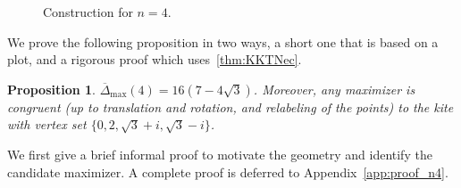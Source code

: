 \documentclass{article}
\newtheorem{proposition}[thr]{Proposition}
\theoremstyle{definition}
\begin{document}
\begin{figure}
\centering
{}
\caption{Construction for \(n=4\).}\label{fig:n=4}
\end{figure}

We prove the following proposition in two ways, a short one that is based on a plot, and a rigorous proof which uses~\cref{thm:KKTNec}.

\begin{proposition}\label{prop:n4}
\(\overline{\Delta}_{\max}(4)=16(7-4\sqrt3)\).
Moreover, any maximizer is congruent (up to translation and rotation, and relabeling of the points)
to the kite with vertex set \(\{0, 2, \sqrt3+i, \sqrt3-i\}\).
\end{proposition}




We first give a brief informal proof to motivate the geometry and identify the candidate maximizer. 
A complete proof is deferred to Appendix~\ref{app:proof_n4}.
\end{document}
